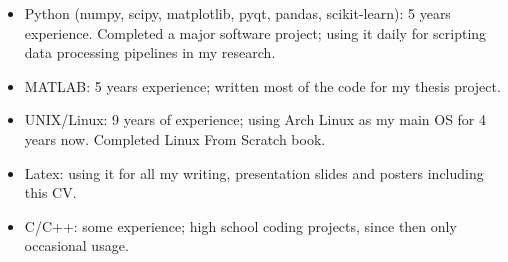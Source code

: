 \begin{itemize}
    \item Python (numpy, scipy, matplotlib, pyqt, pandas, scikit-learn): 5 years experience. Completed a major software project; using it daily for scripting data processing pipelines in my research.
    \item MATLAB: 5 years experience; written most of the code for my thesis project.
    \item UNIX/Linux: 9 years of experience; using Arch Linux as my main OS for 4 years now. Completed Linux From Scratch book.
    \item Latex: using it for all my writing, presentation slides and posters including this CV.
    \item C/C++: some experience; high school coding projects, since then only occasional usage.
\end{itemize}


